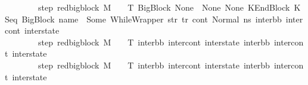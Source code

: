 \begin{isabellebody}
\ \ \ \ \ \ \ \ step{}{\isacharcolon}{\kern0pt}\ {\isachardoublequoteopen}{\isacharparenleft}{\kern0pt}red{\isacharunderscore}{\kern0pt}bigblock\ M\ {\isasymLambda}\ {\isasymGamma}\ {\isasymOmega}\ T\ {\isacharparenleft}{\kern0pt}BigBlock\ None\ {\isacharbrackleft}{\kern0pt}{\isacharbrackright}{\kern0pt}\ None\ None{\isacharcomma}{\kern0pt}\ KEndBlock\ {\isacharparenleft}{\kern0pt}KSeq\ {\isacharparenleft}{\kern0pt}BigBlock\ name\ {\isacharbrackleft}{\kern0pt}{\isacharbrackright}{\kern0pt}\ {\isacharparenleft}{\kern0pt}Some\ {\isacharparenleft}{\kern0pt}WhileWrapper\ str{\isacharparenright}{\kern0pt}{\isacharparenright}{\kern0pt}\ tr{\isacharparenright}{\kern0pt}\ cont{}{\isacharparenright}{\kern0pt}{\isacharcomma}{\kern0pt}\ Normal\ ns{}{\isacharparenright}{\kern0pt}\ {\isacharparenleft}{\kern0pt}inter{\isacharunderscore}{\kern0pt}bb{\isacharcomma}{\kern0pt}\ inter{\isacharunderscore}{\kern0pt}cont{\isacharcomma}{\kern0pt}\ inter{\isacharunderscore}{\kern0pt}state{\isacharparenright}{\kern0pt}{\isacharparenright}{\kern0pt}{\isachardoublequoteclose}\ \ \isanewline
\ \ \ \ \ \ \ \ step{}{\isacharcolon}{\kern0pt}\ {\isachardoublequoteopen}{\isacharparenleft}{\kern0pt}red{\isacharunderscore}{\kern0pt}bigblock\ M\ {\isasymLambda}\ {\isasymGamma}\ {\isasymOmega}\ T\ {\isacharparenleft}{\kern0pt}inter{\isacharunderscore}{\kern0pt}bb{\isacharcomma}{\kern0pt}\ inter{\isacharunderscore}{\kern0pt}cont{\isacharcomma}{\kern0pt}\ inter{\isacharunderscore}{\kern0pt}state{\isacharparenright}{\kern0pt}\ {\isacharparenleft}{\kern0pt}inter{\isacharunderscore}{\kern0pt}bb{}{\isacharcomma}{\kern0pt}\ inter{\isacharunderscore}{\kern0pt}cont{}{\isacharcomma}{\kern0pt}\ inter{\isacharunderscore}{\kern0pt}state{}{\isacharparenright}{\kern0pt}{\isacharparenright}{\kern0pt}{\isachardoublequoteclose}\ \ \isanewline
\ \ \ \ \ \ \ \ step{}{\isacharcolon}{\kern0pt}\ {\isachardoublequoteopen}{\isacharparenleft}{\kern0pt}red{\isacharunderscore}{\kern0pt}bigblock\ M\ {\isasymLambda}\ {\isasymGamma}\ {\isasymOmega}\ T\ {\isacharparenleft}{\kern0pt}inter{\isacharunderscore}{\kern0pt}bb{}{\isacharcomma}{\kern0pt}\ inter{\isacharunderscore}{\kern0pt}cont{}{\isacharcomma}{\kern0pt}\ inter{\isacharunderscore}{\kern0pt}state{}{\isacharparenright}{\kern0pt}\ {\isacharparenleft}{\kern0pt}inter{\isacharunderscore}{\kern0pt}bb{}{\isacharcomma}{\kern0pt}\ inter{\isacharunderscore}{\kern0pt}cont{}{\isacharcomma}{\kern0pt}\ inter{\isacharunderscore}{\kern0pt}state{}{\isacharparenright}{\kern0pt}{\isacharparenright}{\kern0pt}{\isachardoublequoteclose}\ \isanewline

\end{isabellebody}
